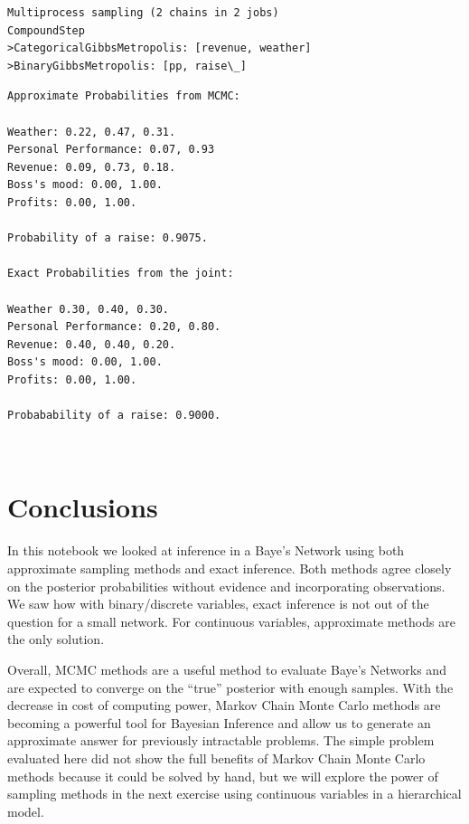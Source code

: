 \documentclass[11pt]{article}
\begin{document}
    \begin{Verbatim}[commandchars=\\\{\}]
Multiprocess sampling (2 chains in 2 jobs)
CompoundStep
>CategoricalGibbsMetropolis: [revenue, weather]
>BinaryGibbsMetropolis: [pp, raise\_]

    \end{Verbatim}

    \begin{Verbatim}[commandchars=\\\{\}]
Approximate Probabilities from MCMC:

Weather: 0.22, 0.47, 0.31.
Personal Performance: 0.07, 0.93
Revenue: 0.09, 0.73, 0.18.
Boss's mood: 0.00, 1.00.
Profits: 0.00, 1.00.

Probability of a raise: 0.9075.

Exact Probabilities from the joint:

Weather 0.30, 0.40, 0.30.
Personal Performance: 0.20, 0.80.
Revenue: 0.40, 0.40, 0.20.
Boss's mood: 0.00, 1.00.
Profits: 0.00, 1.00.

Probabability of a raise: 0.9000.

    \end{Verbatim}

    \begin{center}
    \end{center}
    { \hspace*{\fill} \\}
    
    \hypertarget{conclusions}{%
\section{Conclusions}\label{conclusions}}

In this notebook we looked at inference in a Baye's Network using both
approximate sampling methods and exact inference. Both methods agree
closely on the posterior probabilities without evidence and
incorporating observations. We saw how with binary/discrete variables,
exact inference is not out of the question for a small network. For
continuous variables, approximate methods are the only solution.

Overall, MCMC methods are a useful method to evaluate Baye's Networks
and are expected to converge on the ``true'' posterior with enough
samples. With the decrease in cost of computing power, Markov Chain
Monte Carlo methods are becoming a powerful tool for Bayesian Inference
and allow us to generate an approximate answer for previously
intractable problems. The simple problem evaluated here did not show the
full benefits of Markov Chain Monte Carlo methods because it could be
solved by hand, but we will explore the power of sampling methods in the
next exercise using continuous variables in a hierarchical model.


    
    
    
    
\end{document}
